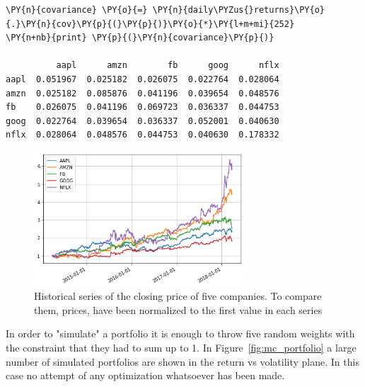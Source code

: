\begin{codebox}
\begin{Verbatim}[commandchars=\\\{\}]
\PY{n}{covariance} \PY{o}{=} \PY{n}{daily\PYZus{}returns}\PY{o}{.}\PY{n}{cov}\PY{p}{(}\PY{p}{)}\PY{o}{*}\PY{l+m+mi}{252}
\PY{n+nb}{print} \PY{p}{(}\PY{n}{covariance}\PY{p}{)}

          aapl      amzn        fb      goog      nflx
aapl  0.051967  0.025182  0.026075  0.022764  0.028064
amzn  0.025182  0.085876  0.041196  0.039654  0.048576
fb    0.026075  0.041196  0.069723  0.036337  0.044753
goog  0.022764  0.039654  0.036337  0.052001  0.040630
nflx  0.028064  0.048576  0.044753  0.040630  0.178332
\end{Verbatim}
\end{codebox}

\begin{figure}[htb]
\centering
\includegraphics[width=0.7\textwidth]{figures/portfolio_sample}
\caption{Historical series of the closing price of five companies. To compare them, prices, have been normalized to the 
first value in each series}
\label{fig:stocks}
\end{figure}
    
In order to "simulate" a portfolio it is enough to throw five random weights 
with the constraint that they had to sum up to 1. 
In Figure~\ref{fig:mc_portfolio} a large number of simulated portfolios are shown in the return vs volatility plane. 
In this case no attempt of any optimization whatsoever has been made.

